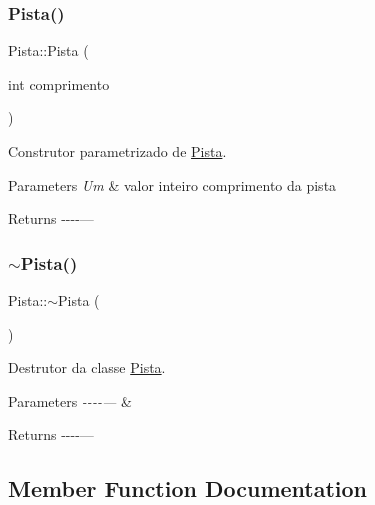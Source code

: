 \subsubsection{\texorpdfstring{Pista()}{Pista()}\hspace{0.1cm}{\footnotesize\ttfamily [2/2]}}
{\footnotesize\ttfamily Pista\+::\+Pista (\begin{DoxyParamCaption}\item[{int}]{comprimento }\end{DoxyParamCaption})}



Construtor parametrizado de \hyperlink{classPista}{Pista}. 


\begin{DoxyParams}{Parameters}
{\em Um} & valor inteiro comprimento da pista \\
\hline
\end{DoxyParams}
\begin{DoxyReturn}{Returns}
-\/-\/-\/-\/--- 
\end{DoxyReturn}
\mbox{\label{classPista_ad6f5c470d1ef5976697058ce42ed26bc}} 
\subsubsection{\texorpdfstring{$\sim$\+Pista()}{~Pista()}}
{\footnotesize\ttfamily Pista\+::$\sim$\+Pista (\begin{DoxyParamCaption}{ }\end{DoxyParamCaption})}



Destrutor da classe \hyperlink{classPista}{Pista}. 


\begin{DoxyParams}{Parameters}
{\em -\/-\/-\/-\/---} & \\
\hline
\end{DoxyParams}
\begin{DoxyReturn}{Returns}
-\/-\/-\/-\/--- 
\end{DoxyReturn}


\subsection{Member Function Documentation}
\mbox{\label{classPista_a138650f65dd855b92bc6fb2482d395cc}} 
